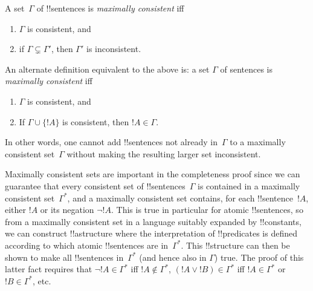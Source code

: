 \documentclass[../../../include/open-logic-section]{subfiles}
\begin{document}

\begin{defn}
A set~$\Gamma$ of !!{sentence}s is \emph{maximally consistent} iff
\begin{enumerate}
\item $\Gamma$ is consistent, and
\item if $\Gamma \subsetneq \Gamma'$, then $\Gamma'$ is inconsistent.
\end{enumerate}
\end{defn}

\begin{explain}
An alternate definition equivalent to the above is: a set $\Gamma$ of
sentences is \emph{maximally consistent} iff
\begin{enumerate}
\item $\Gamma$ is consistent, and
\item If $\Gamma \cup \{ !A \}$ is consistent, then $!A \in \Gamma$.
\end{enumerate}
In other words, one cannot add !!{sentence}s not already in~$\Gamma$
to a maximally consistent set~$\Gamma$ without making the resulting
larger set inconsistent.
\end{explain}

\begin{explain}
Maximally consistent sets are important in the completeness proof
since we can guarantee that every consistent set of !!{sentence}s~$\Gamma$
is contained in a maximally consistent set~$\Gamma^*$, and a maximally
consistent set contains, for each !!{sentence}~$!A$, either $!A$ or its
negation $\lnot !A$. This is true in particular for atomic !!{sentence}s,
so from a maximally consistent set in a language suitably expanded by
!!{constant}s, we can construct !!a{structure} where the
interpretation of !!{predicate}s is defined according to which atomic
!!{sentence}s are in~$\Gamma^*$. This !!{structure} can then be shown to
make all !!{sentence}s in~$\Gamma^*$ (and hence also in $\Gamma$)
true. The proof of this latter fact requires that $\lnot !A \in
\Gamma^*$ iff $!A \notin \Gamma^*$, $(!A \lor !B) \in \Gamma^*$ iff $!A
\in \Gamma^*$ or $!B \in \Gamma^*$, etc.
\end{explain}
\end{document}
